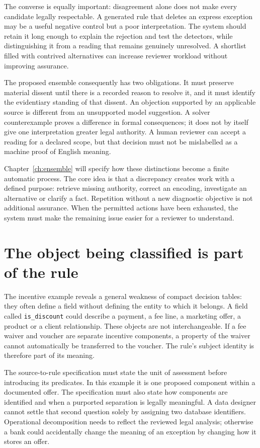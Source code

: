 \documentclass[12pt,a4paper,oneside,openany]{book}
\begin{document}
The converse is equally important: disagreement alone does not make every
candidate legally respectable. A generated rule that deletes an express exception
may be a useful negative control but a poor interpretation. The system should
retain it long enough to explain the rejection and test the detectors, while
distinguishing it from a reading that remains genuinely unresolved. A shortlist
filled with contrived alternatives can increase reviewer workload without
improving assurance.

The proposed ensemble consequently has two obligations. It must preserve
material dissent until there is a recorded reason to resolve it, and it must
identify the evidentiary standing of that dissent. An objection supported by an
applicable source is different from an unsupported model suggestion. A solver
counterexample proves a difference in formal consequences; it does not by itself
give one interpretation greater legal authority. A human reviewer can accept a
reading for a declared scope, but that decision must not be mislabelled as a
machine proof of English meaning.

Chapter~\ref{ch:ensemble} will specify how these distinctions become a finite
automatic process. The core idea is that a discrepancy creates work with a
defined purpose: retrieve missing authority, correct an encoding, investigate an
alternative or clarify a fact. Repetition without a new diagnostic objective is
not additional assurance. When the permitted actions have been exhausted, the
system must make the remaining issue easier for a reviewer to understand.

\section{The object being classified is part of the rule}
\label{merge:M01:05}

\label{sec:problem-objects}
The incentive example reveals a general weakness of compact decision tables:
they often define a field without defining the entity to which it belongs. A
field called \texttt{is\_discount} could describe a payment, a fee line, a
marketing offer, a product or a client relationship. These objects are not
interchangeable. If a fee waiver and voucher are separate incentive components,
a property of the waiver cannot automatically be transferred to the voucher.
The rule's subject identity is therefore part of its meaning.

The source-to-rule specification must state the unit of assessment before
introducing its predicates. In this example it is one proposed component within
a documented offer. The specification must also state how components are
identified and when a purported separation is legally meaningful. A data
designer cannot settle that second question solely by assigning two database
identifiers. Operational decomposition needs to reflect the reviewed legal
analysis; otherwise a bank could accidentally change the meaning of an exception
by changing how it stores an offer.
\end{document}

